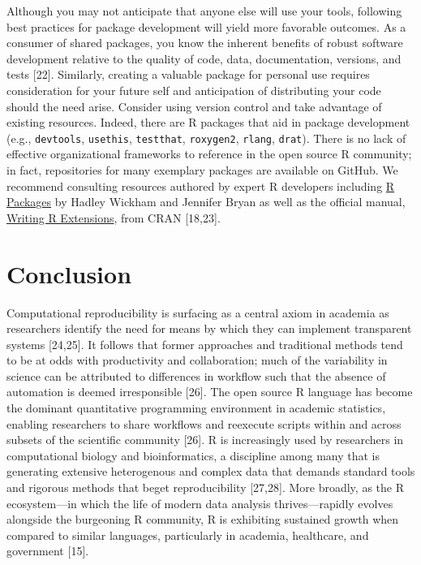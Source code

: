 \documentclass[10pt,letterpaper]{article}
\begin{document}
Although you may not anticipate that anyone else will use your tools,
following best practices for package development will yield more
favorable outcomes. As a consumer of shared packages, you know the
inherent benefits of robust software development relative to the quality
of code, data, documentation, versions, and tests {[}22{]}. Similarly,
creating a valuable package for personal use requires consideration for
your future self and anticipation of distributing your code should the
need arise. Consider using version control and take advantage of
existing resources. Indeed, there are R packages that aid in package
development (e.g., \texttt{devtools}, \texttt{usethis},
\texttt{testthat}, \texttt{roxygen2}, \texttt{rlang}, \texttt{drat}).
There is no lack of effective organizational frameworks to reference in
the open source R community; in fact, repositories for many exemplary
packages are available on GitHub. We recommend consulting resources
authored by expert R developers including \href{https://r-pkgs.org/}{R
Packages} by Hadley Wickham and Jennifer Bryan as well as the official
manual,
\href{https://cran.r-project.org/doc/manuals/r-release/R-exts.html}{Writing
R Extensions}, from CRAN {[}18,23{]}.

\hypertarget{conclusion}{%
\section{Conclusion}\label{conclusion}}

Computational reproducibility is surfacing as a central axiom in
academia as researchers identify the need for means by which they can
implement transparent systems {[}24,25{]}. It follows that former
approaches and traditional methods tend to be at odds with productivity
and collaboration; much of the variability in science can be attributed
to differences in workflow such that the absence of automation is deemed
irresponsible {[}26{]}. The open source R language has become the
dominant quantitative programming environment in academic statistics,
enabling researchers to share workflows and reexecute scripts within and
across subsets of the scientific community {[}26{]}. R is increasingly
used by researchers in computational biology and bioinformatics, a
discipline among many that is generating extensive heterogenous and
complex data that demands standard tools and rigorous methods that beget
reproducibility {[}27,28{]}. More broadly, as the R ecosystem---in which
the life of modern data analysis thrives---rapidly evolves alongside the
burgeoning R community, R is exhibiting sustained growth when compared
to similar languages, particularly in academia, healthcare, and
government {[}15{]}.
\end{document}
